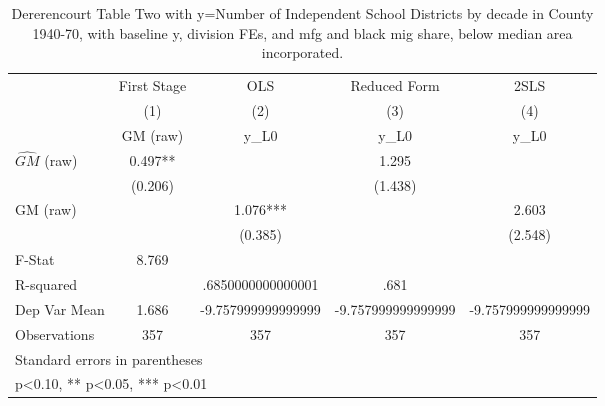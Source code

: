 \begin{table}[htbp]\centering
\def\sym#1{\ifmmode^{#1}\else\(^{#1}\)\fi}
\caption{Dererencourt Table Two with y=Number of Independent School Districts by decade in County 1940-70, with baseline y, division FEs, and mfg and black mig share, below median area incorporated.}
\begin{tabular}{l*{4}{c}}
\toprule
                    & First Stage   &         OLS   &Reduced Form   &        2SLS   \\
                    &\multicolumn{1}{c}{(1)}&\multicolumn{1}{c}{(2)}&\multicolumn{1}{c}{(3)}&\multicolumn{1}{c}{(4)}\\
                    &\multicolumn{1}{c}{GM  (raw)}&\multicolumn{1}{c}{y\_L0}&\multicolumn{1}{c}{y\_L0}&\multicolumn{1}{c}{y\_L0}\\
\midrule
$\hat{GM}$ (raw)    &       0.497** &               &       1.295   &               \\
                    &     (0.206)   &               &     (1.438)   &               \\
\addlinespace
GM  (raw)           &               &       1.076***&               &       2.603   \\
                    &               &     (0.385)   &               &     (2.548)   \\
\midrule
F-Stat              &       8.769   &               &               &               \\
R-squared           &               &.6850000000000001   &        .681   &               \\
Dep Var Mean        &       1.686   &-9.757999999999999   &-9.757999999999999   &-9.757999999999999   \\
Observations        &         357   &         357   &         357   &         357   \\
\bottomrule
\multicolumn{5}{l}{\footnotesize Standard errors in parentheses}\\
\multicolumn{5}{l}{\footnotesize * p<0.10, ** p<0.05, *** p<0.01}\\
\end{tabular}
\end{table}
